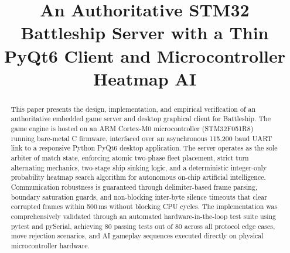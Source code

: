 \documentclass[conference]{IEEEtran}
\begin{document}
\title{An Authoritative STM32 Battleship Server with a Thin PyQt6 Client and Microcontroller Heatmap AI}

\author{
}

\maketitle

\begin{abstract}
This paper presents the design, implementation, and empirical verification of an authoritative embedded game server and desktop graphical client for Battleship. The game engine is hosted on an ARM Cortex-M0 microcontroller (STM32F051R8) running bare-metal C firmware, interfaced over an asynchronous 115,200 baud UART link to a responsive Python PyQt6 desktop application. The server operates as the sole arbiter of match state, enforcing atomic two-phase fleet placement, strict turn alternating mechanics, two-stage ship sinking logic, and a deterministic integer-only probability heatmap search algorithm for autonomous on-chip artificial intelligence. Communication robustness is guaranteed through delimiter-based frame parsing, boundary saturation guards, and non-blocking inter-byte silence timeouts that clear corrupted frames within 500\,ms without blocking CPU cycles. The implementation was comprehensively validated through an automated hardware-in-the-loop test suite using pytest and pySerial, achieving 80 passing tests out of 80 across all protocol edge cases, move rejection scenarios, and AI gameplay sequences executed directly on physical microcontroller hardware.
\end{abstract}
\end{document}
